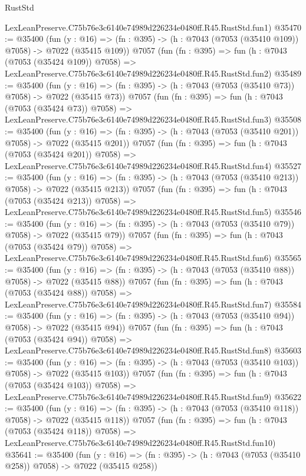 \begin{lexlean}{RustStd}
\begin{coremodule}
    LexLeanPreserve.C75b76e3c6140e74989d226234e0480ff.R45.RustStd.fun1)
@35470 := @35400
    (fun (y : @16) => (fn : @395) -> (h : @7043 (@7053 (@35410 @109)) @7058) -> @7022 (@35415 @109))
    @7057
    (fun (fn : @395) =>
    fun (h : @7043 (@7053 (@35424 @109)) @7058) =>
    LexLeanPreserve.C75b76e3c6140e74989d226234e0480ff.R45.RustStd.fun2)
@35489 := @35400
    (fun (y : @16) => (fn : @395) -> (h : @7043 (@7053 (@35410 @73)) @7058) -> @7022 (@35415 @73))
    @7057
    (fun (fn : @395) =>
    fun (h : @7043 (@7053 (@35424 @73)) @7058) =>
    LexLeanPreserve.C75b76e3c6140e74989d226234e0480ff.R45.RustStd.fun3)
@35508 := @35400
    (fun (y : @16) => (fn : @395) -> (h : @7043 (@7053 (@35410 @201)) @7058) -> @7022 (@35415 @201))
    @7057
    (fun (fn : @395) =>
    fun (h : @7043 (@7053 (@35424 @201)) @7058) =>
    LexLeanPreserve.C75b76e3c6140e74989d226234e0480ff.R45.RustStd.fun4)
@35527 := @35400
    (fun (y : @16) => (fn : @395) -> (h : @7043 (@7053 (@35410 @213)) @7058) -> @7022 (@35415 @213))
    @7057
    (fun (fn : @395) =>
    fun (h : @7043 (@7053 (@35424 @213)) @7058) =>
    LexLeanPreserve.C75b76e3c6140e74989d226234e0480ff.R45.RustStd.fun5)
@35546 := @35400
    (fun (y : @16) => (fn : @395) -> (h : @7043 (@7053 (@35410 @79)) @7058) -> @7022 (@35415 @79))
    @7057
    (fun (fn : @395) =>
    fun (h : @7043 (@7053 (@35424 @79)) @7058) =>
    LexLeanPreserve.C75b76e3c6140e74989d226234e0480ff.R45.RustStd.fun6)
@35565 := @35400
    (fun (y : @16) => (fn : @395) -> (h : @7043 (@7053 (@35410 @88)) @7058) -> @7022 (@35415 @88))
    @7057
    (fun (fn : @395) =>
    fun (h : @7043 (@7053 (@35424 @88)) @7058) =>
    LexLeanPreserve.C75b76e3c6140e74989d226234e0480ff.R45.RustStd.fun7)
@35584 := @35400
    (fun (y : @16) => (fn : @395) -> (h : @7043 (@7053 (@35410 @94)) @7058) -> @7022 (@35415 @94))
    @7057
    (fun (fn : @395) =>
    fun (h : @7043 (@7053 (@35424 @94)) @7058) =>
    LexLeanPreserve.C75b76e3c6140e74989d226234e0480ff.R45.RustStd.fun8)
@35603 := @35400
    (fun (y : @16) => (fn : @395) -> (h : @7043 (@7053 (@35410 @103)) @7058) -> @7022 (@35415 @103))
    @7057
    (fun (fn : @395) =>
    fun (h : @7043 (@7053 (@35424 @103)) @7058) =>
    LexLeanPreserve.C75b76e3c6140e74989d226234e0480ff.R45.RustStd.fun9)
@35622 := @35400
    (fun (y : @16) => (fn : @395) -> (h : @7043 (@7053 (@35410 @118)) @7058) -> @7022 (@35415 @118))
    @7057
    (fun (fn : @395) =>
    fun (h : @7043 (@7053 (@35424 @118)) @7058) =>
    LexLeanPreserve.C75b76e3c6140e74989d226234e0480ff.R45.RustStd.fun10)
@35641 := @35400
    (fun (y : @16) => (fn : @395) -> (h : @7043 (@7053 (@35410 @258)) @7058) -> @7022 (@35415 @258))

\end{coremodule}
\end{lexlean}
